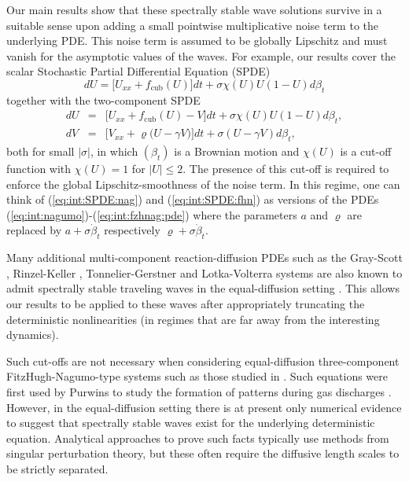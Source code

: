 \documentclass[10pt]{articleHJ}
\newcommand{\abs}[1]{\left\vert#1\right\vert}			%
\newcommand{\sref}[1]{(\ref{#1})}                       %
\numberwithin{equation}{section}
\begin{document}
Our main results show that these spectrally
stable wave solutions survive in a suitable
sense upon adding a small pointwise
multiplicative
noise term to the underlying PDE. This
noise term is assumed to be globally Lipschitz and
must vanish for the asymptotic
values of the waves. For example,
our results
cover the scalar Stochastic Partial Differential Equation (SPDE)
\begin{equation}
\label{eq:int:SPDE:nag}
dU = \big[ U_{xx} + f_{\mathrm{cub}}(U) ] dt
+ \sigma \chi(U)  U ( 1 - U) d \beta_t
\end{equation}
together with the two-component SPDE
\begin{equation}
\label{eq:int:SPDE:fhn}
\begin{array}{lcl}
dU & = & \big[ U_{xx} + f_{\mathrm{cub}}(U) - V] dt
+ \sigma \chi(U)  U ( 1 - U) d \beta_t ,
\\[0.2cm]
dV & = & \big[V_{xx} + \varrho \big( U - \gamma V \big) \big] dt + \sigma (U - \gamma V) d \beta_t ,
\end{array}
\end{equation}
both for small $\abs{\sigma}$,
in which $(\beta_t)$
is a Brownian motion and $\chi(U)$
is a cut-off function with $\chi(U) = 1$
for $\abs{U} \le 2$. The presence
of this cut-off is required to
enforce the global Lipschitz-smoothness of the noise term.
In this regime, one can think of \sref{eq:int:SPDE:nag} and
\sref{eq:int:SPDE:fhn}
as versions of the PDEs \sref{eq:int:nagumo}-\sref{eq:int:fzhnag:pde}
where the parameters $a$ and $\varrho$ are replaced by
$a + \sigma  \dot{\beta}_t$ respectively $\varrho + \sigma  \dot{\beta}_t$.

Many additional
multi-component reaction-diffusion PDEs
such as the Gray-Scott
\cite{lee1994experimental},
Rinzel-Keller \cite{rinzel1973traveling},
Tonnelier-Gerstner
\cite{tonnelier2003piecewise}
and Lotka-Volterra systems \cite{iannelli2015introduction}
are also known to admit spectrally stable
traveling waves in the equal-diffusion
setting
\cite{hale1999stability, zemskov2010wave, gardner1982existence}.
This allows our results to be applied to these waves
after appropriately truncating the
deterministic nonlinearities
(in regimes that are far away from the interesting
dynamics).

Such cut-offs are not necessary
when considering equal-diffusion
three-component FitzHugh-Nagumo-type systems
such as those studied in \cite{ORG1998,van2010front}.
Such equations were first used by Purwins
to study the formation
of patterns during gas discharges \cite{SCHENK1997}.
However, in the equal-diffusion setting there is at present
only numerical evidence to suggest that spectrally stable waves
exist for the underlying deterministic equation.
Analytical approaches to prove such facts typically use methods from
singular perturbation theory, but these often require
the diffusive length scales to be strictly separated.
\end{document}
